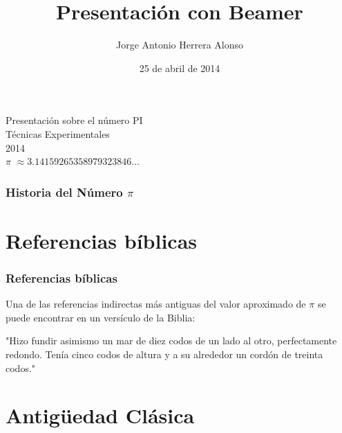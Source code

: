 \documentclass{beamer}
\title[El Número PI]{Presentación con Beamer}
\author{Jorge Antonio Herrera Alonso}
\date[25-04-2014]{25 de abril de 2014}
\begin{document}
  
\begin{frame}

  \begin{small}
    \begin{center}
     Presentación sobre el número PI \\
     Técnicas Experimentales \\
     2014 \\
     $\pi$ $\approx 3.14159265358979323846... $
    \end{center}
  \end{small}

\end{frame}

\begin{frame}
  \frametitle{Historia del Número $\pi$}
  \tableofcontents[pausesections]
\end{frame}


\section{\bf Referencias bíblicas}


\begin{frame}

\frametitle{\bf Referencias bíblicas}

Una de las referencias indirectas más antiguas del valor aproximado de $\pi$ se puede encontrar en un versículo de la Biblia:

 "Hizo fundir asimismo un mar de diez codos de un lado al otro, perfectamente redondo. Tenía cinco codos de altura y a su alrededor un cordón de treinta codos."


\end{frame}

\section{\bf Antigüedad Clásica}
\end{document}
